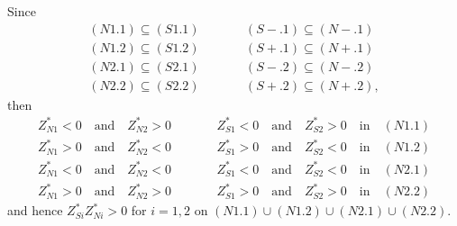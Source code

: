 \documentclass[10pt]{article}
\begin{document}
Since
\begin{eqnarray*}
(N1.1) \subseteq (S1.1) & \qquad & (S-.1) \subseteq (N-.1) \\
(N1.2) \subseteq (S1.2) & \qquad & (S+.1) \subseteq (N+.1) \\
(N2.1) \subseteq (S2.1) & \qquad & (S-.2) \subseteq (N-.2) \\
(N2.2) \subseteq (S2.2) & \qquad & (S+.2) \subseteq (N+.2), 
\end{eqnarray*}
then
\begin{eqnarray*}
Z_{N1}^* < 0 \quad \text{and} \quad Z_{N2}^* > 0 \quad & & \quad Z_{S1}^* < 0 \quad \text{and} \quad Z_{S2}^* > 0 \quad \text{in} \quad (N1.1) \\
Z_{N1}^* > 0 \quad \text{and} \quad Z_{N2}^* < 0 \quad & & \quad Z_{S1}^* > 0 \quad \text{and} \quad Z_{S2}^* < 0 \quad \text{in} \quad (N1.2) \\
Z_{N1}^* < 0 \quad \text{and} \quad Z_{N2}^* < 0 \quad & & \quad Z_{S1}^* < 0 \quad \text{and} \quad Z_{S2}^* < 0 \quad \text{in} \quad (N2.1) \\
Z_{N1}^* > 0 \quad \text{and} \quad Z_{N2}^* > 0 \quad & & \quad Z_{S1}^* > 0 \quad \text{and} \quad Z_{S2}^* > 0 \quad \text{in} \quad (N2.2) 
\end{eqnarray*}
and hence $ Z_{S i}^* Z_{N i}^* > 0 $ for $ i = 1, 2 $ on $ (N1.1) \cup (N1.2) \cup (N2.1) \cup (N2.2) $.
\end{document}
